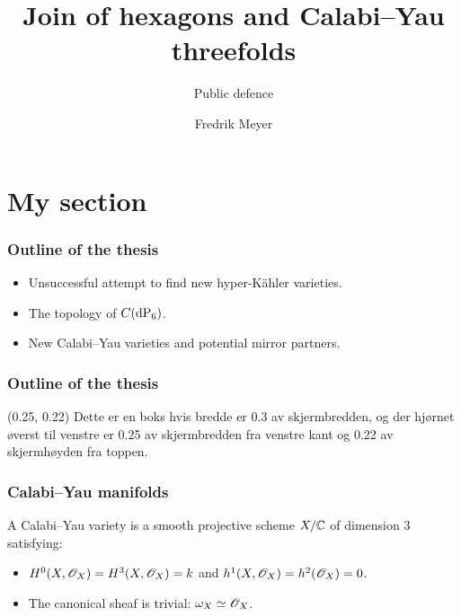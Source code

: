 \documentclass[UKenglish]{beamer}
\title{Join of hexagons and {Calabi--Yau} threefolds}
\subtitle{Public defence}
\author{Fredrik Meyer}
\begin{document}
\section[Section]{My section}
\begin{frame}
\frametitle{Outline of the thesis}

\begin{itemize}
	\item Unsuccessful attempt to find new hyper-Kähler varieties. \pause
	\item The topology of $C(\dP6)$. \pause
	\item New Calabi--Yau varieties and potential mirror partners.
\end{itemize}

\end{frame}

\begin{frame}
\frametitle{Outline of the thesis}

    \begin{textblock}{0.3}(0.25, 0.22)
        Dette er en boks hvis bredde er \alert{0.3} av skjermbredden, og der hjørnet øverst til venstre er \alert{0.25} av skjermbredden fra venstre kant og \alert{0.22} av skjermhøyden fra toppen.
    \end{textblock}

\end{frame}

\begin{frame}
\frametitle{Calabi--Yau manifolds}

\begin{definition}
A Calabi--Yau variety is a smooth projective scheme $X/\mathbb C$ of dimension $3$ satisfying:
\begin{itemize}
	\item $H^0(X,\mathscr{O}_X)=H^3(X,\mathscr{O}_X)=k$ and $h^1(X,\mathscr{O}_X)=h^2(\mathscr{O}_X)=0$.
	\item The canonical sheaf is trivial: $\omega_X \simeq \mathscr{O}_X$. 
\end{itemize}
\end{definition}

\end{frame}
\end{document}
